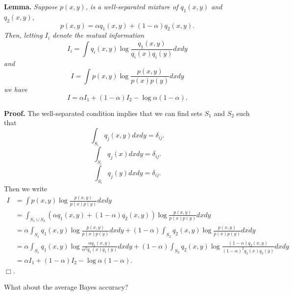 \documentclass[12pt]{article}
\begin{document}
\noindent\textbf{Lemma.}\emph{
Suppose $p(x, y)$, is a well-separated mixture of $q_1(x, y)$ and $q_2(x, y)$,
\[
p(x, y) = \alpha q_1(x, y) + (1-\alpha) q_2(x, y).
\]
Then, letting $I_i$ denote the mutual information
\[
I_i = \int q_i(x, y) \log \frac{q_1(x, y)}{q_i(x) q_i(y)} dx dy
\]
and
\[
I = \int p(x, y) \log \frac{p(x, y)}{p(x) p(y)} dx dy
\]
we have
\[
I = \alpha I_1 + (1-\alpha) I_2 - \log \alpha(1-\alpha).
\]
}

\noindent\textbf{Proof.}
The well-separated condition implies that we can find sets $S_1$ and $S_2$ such that
\[
\int_{S_i} q_j(x, y) dx dy = \delta_{ij}.
\]
\[
\int_{S_i} q_j(x) dx dy = \delta_{ij}.
\]
\[
\int_{S_i} q_j(y) dx dy = \delta_{ij}.
\]
Then we write
\begin{align*}
I &= \int p(x, y) \log \frac{p(x, y)}{p(x)p(y)}dx dy
\\&= \int_{S_1 \cup S_2} (\alpha q_1(x, y) + (1-\alpha) q_2(x, y))\log \frac{p(x, y)}{p(x)p(y)}dx dy
\\&= \alpha \int_{S_1}q_1(x, y) \log \frac{p(x, y)}{p(x)p(y)}dx dy + (1-\alpha) \int_{S_2}q_2(x, y) \log \frac{p(x, y)}{p(x)p(y)}dx dy
\\&= \alpha \int_{S_1}q_1(x, y) \log \frac{\alpha q_1(x, y)}{\alpha^2 q_1(x)q_1(y)}dx dy + (1-\alpha) \int_{S_2}q_2(x, y) \log \frac{(1-\alpha)q_2(x, y)}{(1-\alpha)^2 q_2(x)q_2(y)}dx dy\\&= \alpha I_1 + (1-\alpha) I_2 - \log \alpha(1-\alpha).
\end{align*}
$\Box$.

What about the average Bayes accuracy?
\end{document}

